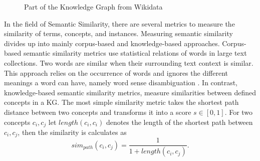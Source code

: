 \documentclass[pdftex,a4paper,12pt]{scrartcl}
\theoremstyle{definition}
\begin{document}
\begin{figure}

    \centering
    \caption{Part of the Knowledge Graph from Wikidata}
    \label{fig:kg}
\end{figure}

In the field of Semantic Similarity, there are several metrics to measure the similarity of terms, concepts, and instances.
Measuring semantic similarity divides up into mainly corpus-based and knowledge-based approaches. Corpus-based semantic similarity metrics use statistical relations of words in large text collections. Two words are similar when their surrounding text context is similar. This approach relies on the occurrence of words and ignores the different meanings a word can have, namely word sense disambiguation \citep{zhu_computing_2017}. 
In contrast, knowledge-based semantic similarity metrics, measure similarities between defined concepts in a KG. The most simple similarity metric takes the shortest path distance between two concepts and transforms it into a score $s \in [0,1]$. For two concepts $c_i,c_j$ let $length(c_i,c_i)$ denotes the length of the shortest path between $c_i,c_j$, then the similarity is calculates as 
\begin{equation}
    sim_{path}(c_i,c_j) = \frac{1}{1+length(c_i,c_j)}.
\end{equation}
\end{document}
